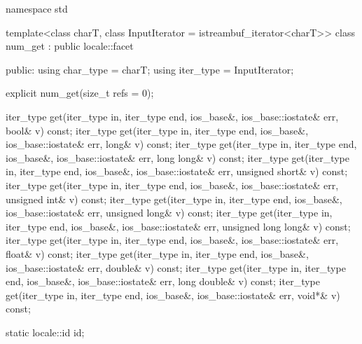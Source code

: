 %
\begin{codeblock}
namespace std {
  template<class charT, class InputIterator = istreambuf_iterator<charT>>
    class num_get : public locale::facet {
    public:
      using char_type = charT;
      using iter_type = InputIterator;

      explicit num_get(size_t refs = 0);

      iter_type get(iter_type in, iter_type end, ios_base&,
                    ios_base::iostate& err, bool& v) const;
      iter_type get(iter_type in, iter_type end, ios_base&,
                    ios_base::iostate& err, long& v) const;
      iter_type get(iter_type in, iter_type end, ios_base&,
                    ios_base::iostate& err, long long& v) const;
      iter_type get(iter_type in, iter_type end, ios_base&,
                    ios_base::iostate& err, unsigned short& v) const;
      iter_type get(iter_type in, iter_type end, ios_base&,
                    ios_base::iostate& err, unsigned int& v) const;
      iter_type get(iter_type in, iter_type end, ios_base&,
                    ios_base::iostate& err, unsigned long& v) const;
      iter_type get(iter_type in, iter_type end, ios_base&,
                    ios_base::iostate& err, unsigned long long& v) const;
      iter_type get(iter_type in, iter_type end, ios_base&,
                    ios_base::iostate& err, float& v) const;
      iter_type get(iter_type in, iter_type end, ios_base&,
                    ios_base::iostate& err, double& v) const;
      iter_type get(iter_type in, iter_type end, ios_base&,
                    ios_base::iostate& err, long double& v) const;
      iter_type get(iter_type in, iter_type end, ios_base&,
                    ios_base::iostate& err, void*& v) const;

      static locale::id id;

}}
\end{codeblock}
